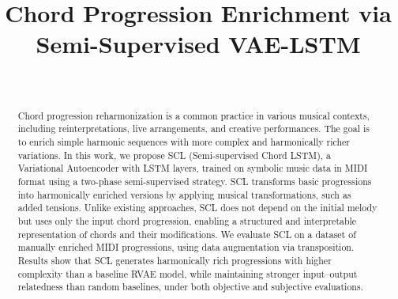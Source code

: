 \documentclass[conference]{IEEEtran}
\title{Chord Progression Enrichment via Semi-Supervised VAE-LSTM}
\author{\IEEEauthorblockN{Anonymous Authors}\\
\IEEEauthorblockA{Anonymous Institution, Anonymous Country\\
Email: anonymous@submission.org}}
\begin{document}
\maketitle

\begin{abstract}
    Chord progression reharmonization is a common practice in various musical contexts, including reinterpretations, live arrangements, and creative performances. The goal is to enrich simple harmonic sequences with more complex and harmonically richer variations. 
    In this work, we propose SCL (Semi-supervised Chord LSTM), a Variational Autoencoder with LSTM layers, trained on symbolic music data in MIDI format using a two-phase semi-supervised strategy.
    SCL transforms basic progressions into harmonically enriched versions by applying musical transformations, such as added tensions. Unlike existing approaches, SCL does not depend on the initial melody but uses only the input chord progression, enabling a structured and interpretable representation of chords and their modifications. We evaluate SCL on a dataset of manually enriched MIDI progressions, using data augmentation via transposition. Results show that SCL generates harmonically rich progressions with higher complexity than a baseline RVAE model, while maintaining stronger input--output relatedness than random baselines, under both objective and subjective evaluations.
\end{abstract}
\end{document}
